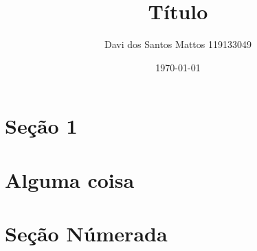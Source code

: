 \documentclass[12pt,a4paper]{article}
\title{Título}
\author{Davi dos Santos Mattos 119133049}
\date{\today}
\begin{document}
\maketitle

\section*{Seção 1}
\hspace{1cm}
\lipsum[1]

\section{Alguma coisa}
\lipsum[1]
\section{Seção Númerada}
\lipsum[2]
\end{document}
